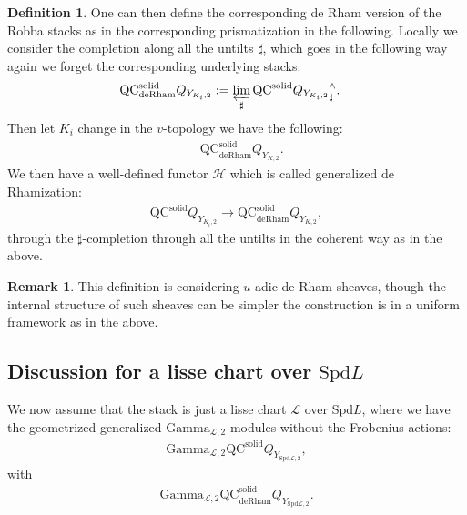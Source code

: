 \documentclass[12pt]{article}
\theoremstyle{definition}
\newtheorem{remark}{Remark}
\newtheorem{definition}{Definition}
\begin{document}
\begin{definition}
One can then define the corresponding de Rham version of the Robba stacks as in the corresponding prismatization in the following. Locally we consider the completion along all the untilts $\sharp$, which goes in the following way again we forget the corresponding underlying stacks:
\begin{align}
&\mathrm{QC}^\mathrm{solid}_{\mathrm{deRham}}Q_{Y_{K_i,2}}:=\varprojlim_{\sharp} \mathrm{QC}^\mathrm{solid}{Q_{Y_{K_i,2}}}^\wedge_\sharp.
\end{align}
Then let $K_i$ change in the $v$-topology we have the following:
\begin{align}
&\mathrm{QC}^\mathrm{solid}_{\mathrm{deRham}}Q_{Y_{K,2}}.
\end{align}
We then have a well-defined functor $\mathcal{H}$ which is called generalized de Rhamization:
\begin{align}
\mathrm{QC}^\mathrm{solid}Q_{Y_{K_i,2}}
\longrightarrow
\mathrm{QC}^\mathrm{solid}_{\mathrm{deRham}}Q_{Y_{K,2}},
\end{align}
through the $\sharp$-completion through all the untilts in the coherent way as in the above.
\end{definition}


\begin{remark}
This definition is considering $u$-adic de Rham sheaves, though the internal structure of such sheaves can be simpler the construction is in a uniform framework as in the above. 
\end{remark}


\subsection{Discussion for a lisse chart over $\mathrm{Spd}L$}

\noindent We now assume that the stack is just a lisse chart $\mathcal{L}$ over $\mathrm{Spd}L$, where we have the geometrized generalized $\mathrm{Gamma}_{\mathcal{L},2}$-modules without the Frobenius actions:
\begin{align}
\mathrm{Gamma}_{\mathcal{L},2}\mathrm{QC}^\mathrm{solid}Q_{Y_{\mathrm{Spd}\mathcal{L},2}},
\end{align}
with
\begin{align}
\mathrm{Gamma}_{\mathcal{L},2}\mathrm{QC}_\mathrm{deRham}^\mathrm{solid}Q_{Y_{\mathrm{Spd}\mathcal{L},2}}.
\end{align}
\end{document}
